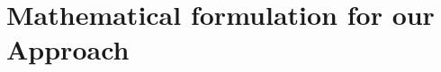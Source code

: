 \documentclass{article}
\numberwithin{equation}{section}
\theoremstyle{definition}
\begin{document}












\section{Mathematical formulation for our Approach}

\end{document}

